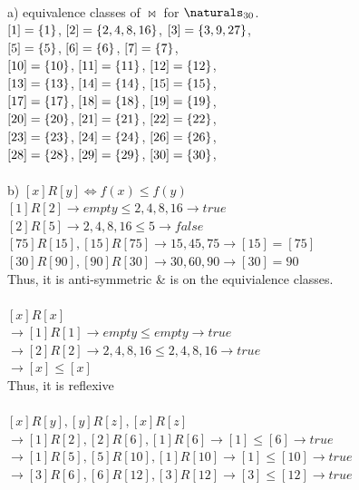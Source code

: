 \documentclass[11pt]{article}
\begin{document}
\begin{solution}
\\a) equivalence classes of $\bowtie$ for $\naturals_{30}$.
\\$[1]= {\left\{ 1 \right\} }$, $[2] = {\left\{ 2,4,8,16 \right\} }$, $[3] = {\left\{ 3,9,27 \right\} }$,
\\$[5] = {\left\{ 5 \right\} }$, $[6] = {\left\{ 6 \right\} }$, $[7] = {\left\{ 7 \right\} }$,
\\$[10] = {\left\{ 10 \right\} }$, $[11] = {\left\{ 11 \right\} }$, $[12] = {\left\{ 12 \right\} }$,
\\$[13] = {\left\{ 13 \right\} }$, $[14] = {\left\{ 14 \right\} }$, $[15] = {\left\{ 15 \right\} }$,
\\$[17] = {\left\{ 17 \right\} }$, $[18] = {\left\{ 18 \right\} }$, $[19] = {\left\{ 19 \right\} }$,
\\$[20] = {\left\{ 20 \right\} }$, $[21] = {\left\{ 21 \right\} }$, $[22] = {\left\{ 22 \right\} }$,
\\$[23] = {\left\{ 23 \right\} }$, $[24] = {\left\{ 24 \right\} }$, $[26] = {\left\{ 26 \right\} }$,
\\$[28] = {\left\{ 28 \right\} }$, $[29] = {\left\{ 29 \right\} }$, $[30] = {\left\{ 30 \right\} }$,
\\
\\b) $[x]R[y] \Leftrightarrow f(x) \leq f(y)$
\\$[1]R[2] \rightarrow {empty} \leq {2,4,8,16} \rightarrow true$
\\$[2]R[5] \rightarrow {2,4,8,16} \leq {5} \rightarrow false$
\\$[75]R[15], [15]R[75] \rightarrow {15,45,75} \rightarrow [15] = [75]$
\\$[30]R[90], [90]R[30] \rightarrow {30,60,90} \rightarrow [30] = 90$
\\Thus, it is anti-symmetric & is on the equivialence classes.
\\
\\$[x]R[x]$
\\$\rightarrow [1]R[1] \rightarrow {empty} \leq {empty} \rightarrow true$
\\$\rightarrow [2]R[2] \rightarrow {2,4,8,16} \leq {2,4,8,16} \rightarrow true$
\\$\rightarrow [x] \leq [x]$
\\Thus, it is reflexive
\\
\\$[x]R[y],[y]R[z],[x]R[z]$
\\$\rightarrow [1]R[2],[2]R[6],[1]R[6] \rightarrow [1] \leq [6] \rightarrow true$
\\$\rightarrow [1]R[5],[5]R[10],[1]R[10] \rightarrow [1] \leq [10] \rightarrow true$
\\$\rightarrow [3]R[6],[6]R[12],[3]R[12] \rightarrow [3] \leq [12] \rightarrow true$

\end{solution}
\end{document}
